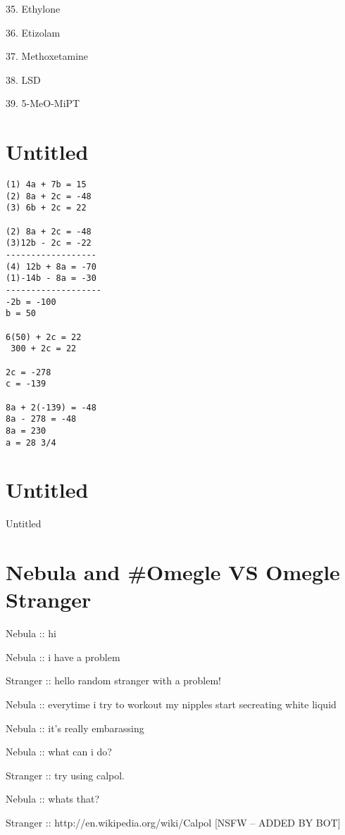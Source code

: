 \documentclass[a1paper]{article}
\begin{document}
\begin{multicols}{7}
{35. Ethylone

36. Etizolam

37. Methoxetamine

38. LSD

39. 5-MeO-MiPT
\setlength{\parskip}{0.8em}








\section{Untitled}
\begin{verbatim}
(1) 4a + 7b = 15
(2) 8a + 2c = -48
(3) 6b + 2c = 22

(2) 8a + 2c = -48
(3)12b - 2c = -22
------------------
(4) 12b + 8a = -70
(1)-14b - 8a = -30
-------------------
-2b = -100
b = 50

6(50) + 2c = 22
 300 + 2c = 22
 
2c = -278
c = -139

8a + 2(-139) = -48
8a - 278 = -48
8a = 230
a = 28 3/4
\end{verbatim}





\section{Untitled}

Untitled




\section{Nebula and \#Omegle VS Omegle Stranger}

\setlength{\parskip}{0cm}

Nebula :: hi

Nebula :: i have a problem

Stranger :: hello random stranger with a problem!

Nebula :: everytime i try to workout my nipples start secreating white liquid

Nebula :: it's really embarassing

Nebula :: what can i do?

Stranger :: try using calpol.

Nebula :: whats that?

Stranger :: http://en.wikipedia.org/wiki/Calpol [NSFW -- ADDED BY BOT]

}
\end{multicols}
\end{document}

